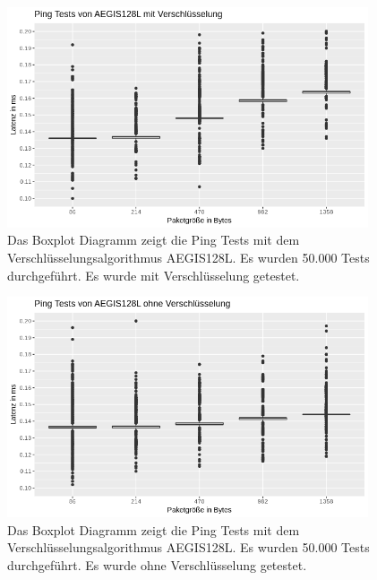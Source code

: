 \begin{figure}[!p]
\centering
\includegraphics[width=0.95\textwidth]{images/aegiseping.png}
\caption[Ping Diagramm mit AEGIS128L mit Verschlüsselung]{Das Boxplot Diagramm zeigt die Ping Tests mit dem Verschlüsselungsalgorithmus AEGIS128L. Es wurden 50.000 Tests durchgeführt. Es wurde mit Verschlüsselung getestet. }
\label{img:AEGISping}
\end{figure}
\begin{figure}[!p]
\centering
\includegraphics[width=0.95\textwidth]{images/aegisweping.png}
\caption[Ping Diagramm mit AEGIS128L ohne Verschlüsselung]{Das Boxplot Diagramm zeigt die Ping Tests mit dem Verschlüsselungsalgorithmus AEGIS128L. Es wurden 50.000 Tests durchgeführt. Es wurde ohne Verschlüsselung getestet.  }
\label{img:CPU-WE2}
\end{figure}
